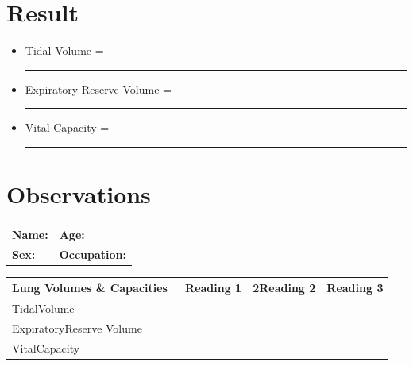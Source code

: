 \documentclass[a4paper,12pt,openany,oneside]{book}
\begin{document}
															\section*{Result}
														\begin{itemize}
														\item[]	Tidal Volume						=\rule{5cm}{.5pt}	
\item[]		Expiratory Reserve Volume				=\rule{5cm}{.5pt}
\item[]			Vital Capacity						=\rule{5cm}{.5pt}	
														\end{itemize}

														\section*{Observations}

															\begin{tabular}{p{5in} p{1in}}
																\textbf{Name:}  & \textbf{Age:}\\
																\textbf{Sex:}   & \textbf{Occupation:}
															\end{tabular}

\begin{table}[H]
\centering
\begin{tabular}{|l|l|l|l|} 
	\hline
	\textbf{Lung			Volumes \& Capacities}~							 &  \textbf{Reading			1} &  2\textbf{Reading			2} &  \textbf{Reading			3}  \\ 
	\hline
	TidalVolume                                   &                       &                        &                        \\ 
	\hline
	ExpiratoryReserve Volume                      &                       &                        &                        \\ 
	\hline
	VitalCapacity                                 &                       &                        &                        \\
	\hline
\end{tabular}
\end{table}
\end{document}
